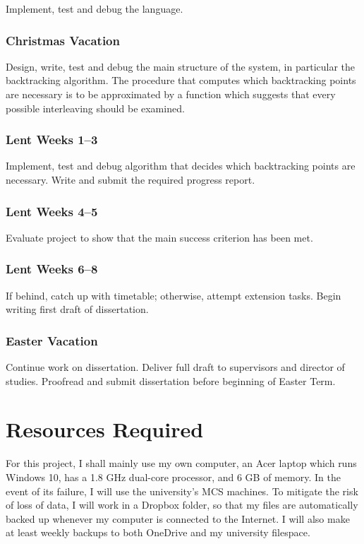 \documentclass[12pt,a4paper,twoside]{article}
\begin{document}
Implement, test and debug the language.

\subsubsection*{Christmas Vacation}

Design, write, test and debug the main structure of the system, in particular
the backtracking algorithm. The procedure that computes which backtracking
points are necessary is to be approximated by a function which suggests that every possible interleaving should
be examined.


\subsubsection*{Lent Weeks 1--3}

Implement, test and debug algorithm that decides which backtracking points are
necessary. Write and submit the required progress report.

\subsubsection*{Lent Weeks 4--5}

Evaluate project to show that the main success criterion has been met.

\subsubsection*{Lent Weeks 6--8}

If behind, catch up with timetable; otherwise, attempt
extension tasks. Begin writing first draft of dissertation.

\subsubsection*{Easter Vacation}

Continue work on dissertation. Deliver full draft to supervisors and
director of studies. Proofread and submit dissertation before beginning
of Easter Term.

\section*{Resources Required}

For this project, I shall mainly use my own computer,
an Acer laptop which runs Windows 10, has a 1.8 GHz dual-core processor,
and 6 GB of memory. In the event of its failure, I will use
the university's MCS machines. To mitigate the risk of loss of data,
I will work in a Dropbox folder, so that my files are automatically
backed up whenever my computer is connected to the Internet.
I will also make at least weekly backups to both OneDrive
and my university filespace.
\end{document}
